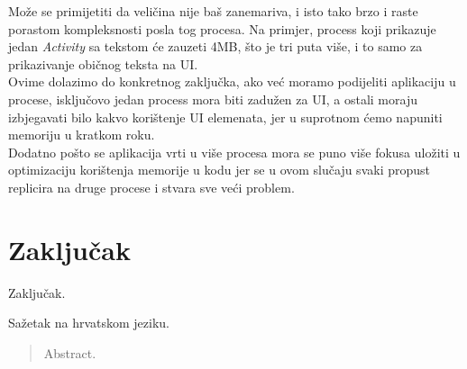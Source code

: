 \documentclass[times, utf8, zavrsni]{fer}
\begin{document}
Može se primijetiti da veličina nije baš zanemariva, i isto tako brzo i raste porastom kompleksnosti posla tog procesa. Na primjer, process koji prikazuje jedan \textit{Activity} sa tekstom će zauzeti 4MB, što je tri puta više, i to samo za prikazivanje običnog teksta na UI.\\

Ovime dolazimo do konkretnog zaključka, ako već moramo podijeliti aplikaciju u procese, isključovo jedan process mora biti zadužen za UI, a ostali moraju izbjegavati bilo kakvo korištenje UI elemenata, jer u suprotnom ćemo napuniti memoriju u kratkom roku.\\

Dodatno pošto se aplikacija vrti u više procesa mora se puno više fokusa uložiti u optimizaciju korištenja memorije u kodu jer se u ovom slučaju svaki propust replicira na druge procese i stvara sve veći problem.


\chapter{Zaključak}
Zaključak.




\begin{sazetak}
Sažetak na hrvatskom jeziku.

\end{sazetak}

\begin{abstract}
Abstract.

\end{abstract}
\end{document}
